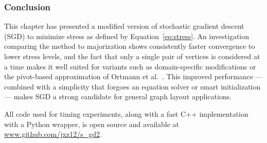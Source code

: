 \subsubsection{Conclusion}
This chapter has presented a modified version of stochastic gradient descent (SGD) to minimize stress as defined by Equation~\eqref{eq:stress}. An investigation comparing the method to majorization shows consistently faster convergence to lower stress levels, and the fact that only a single pair of vertices is considered at a time makes it well suited for variants such as domain-specific modifications or the pivot-based approximation of Ortmann et al.\ \cite{Ortmann2017}.
This improved performance --- combined with a simplicity that forgoes an equation solver or smart initialization --- makes
SGD a strong candidate for general graph layout applications.

All code used for timing experiments, along with a fast C++ implementation with a Python wrapper, is open source and available at \url{www.github.com/jxz12/s_gd2}.%